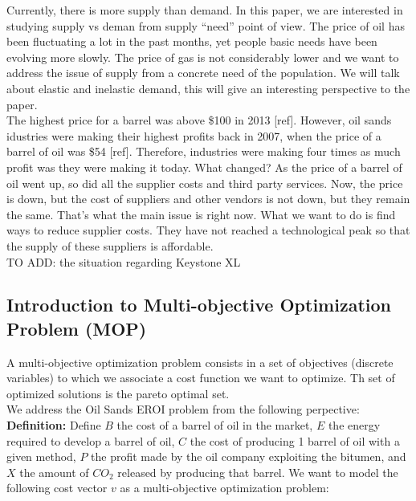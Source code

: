 \documentclass[12pt]{article}
\begin{document}
Currently, there is more supply than demand. In this paper, we are interested in studying supply vs deman from supply ``need'' point of view. The price of oil has been fluctuating a lot in the past months, yet people basic needs have been evolving more slowly. The price of gas is not considerably lower and we want to address the issue of  supply from a concrete need of the population. We will talk about elastic and inelastic demand, this will give an interesting perspective to the paper. \\

The highest price for a barrel was above \$100 in 2013 [ref]. However, oil sands idustries were making their highest profits back in 2007, when the price of a barrel of oil was \$54 [ref]. Therefore, industries were making four times as much profit was they were making it today. What changed? As the price of a barrel of oil went up, so did all the supplier costs and third party services. Now, the price is down, but the cost of suppliers and other vendors is not down, but they remain the same. That's what the main issue is right now. What we want to do is find ways to reduce supplier costs. They have not reached a technological peak so that the supply of these suppliers is affordable.\\

TO ADD: the situation regarding Keystone XL

\subsection{Introduction to Multi-objective Optimization Problem (MOP)}

A multi-objective optimization problem consists in a set of objectives (discrete variables) to which we associate a cost function we want to optimize. Th set of optimized solutions is the pareto optimal set. \\

We address the Oil Sands EROI problem from the following perpective: \\

{\bf Definition:} Define $B$ the cost of a barrel of oil in the market, $E$ the energy required to develop a barrel of oil, $C$ the cost of producing 1 barrel of oil with a given method, $P$ the profit made by the oil company exploiting the bitumen, and $X$ the amount of $CO_2$ released by producing that barrel. We want to model the following cost vector $v$ as a multi-objective optimization problem:
\end{document}
